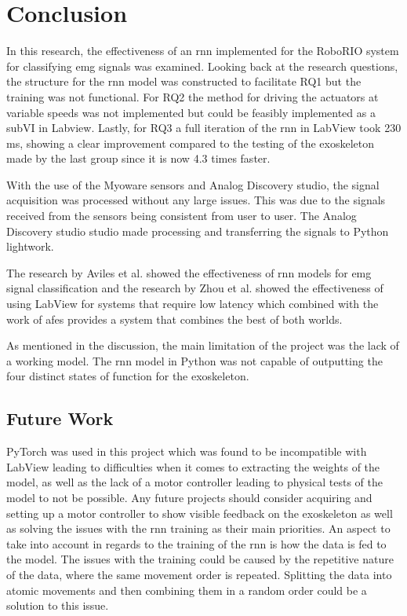 \section{Conclusion}
In this research, the effectiveness of an \acrshort{rnn} implemented for the RoboRIO system for classifying \acrshort{emg} signals
was examined. Looking back at the research questions, the structure for the \acrshort{rnn} model was constructed to facilitate RQ1
but the training was not functional. For RQ2 the method for driving the actuators at variable speeds was not implemented but could be
feasibly implemented as a subVI in Labview. Lastly, for RQ3 a full iteration of the \acrshort{rnn} in LabView took 230 ms, showing a
clear improvement compared to the testing of the exoskeleton made by the last group since it is now 4.3 times faster.

With the use of the Myoware sensors and Analog Discovery studio, the signal acquisition was processed without any large issues. 
This was due to the signals received from the sensors being consistent from user to user. 
The Analog Discovery studio studio made processing and transferring the signals to Python lightwork.

The research by Aviles et al. \cite{RNNEMG} showed the effectiveness of \acrshort{rnn} models for \acrshort{emg} signal classification and
the research by Zhou et al. \cite{shoulderexo} showed the effectiveness of using LabView for systems that require low latency which combined
with the work of \acrshort{afes} \cite{AFES} provides a system that combines the best of both worlds.

As mentioned in the discussion, the main limitation of the project was the lack of a working model. The \acrshort{rnn} model in Python was not
capable of outputting the four distinct states of function for the exoskeleton.

\subsection{Future Work}

PyTorch was used in this project which was found to be incompatible with LabView leading to difficulties when it comes to extracting the 
weights of the model, as well as the lack of a motor controller leading to physical tests of the model to not be possible. 
Any future projects should consider acquiring and setting up a motor controller to show visible feedback on the 
exoskeleton as well as solving the issues with the \acrshort{rnn} training as their main priorities.
An aspect to take into account in regards to the training of the \acrshort{rnn} is how the data is fed to the model. The issues
with the training could be caused by the repetitive nature of the data, where the same movement order is repeated. Splitting the data
into atomic movements and then combining them in a random order could be a solution to this issue.

